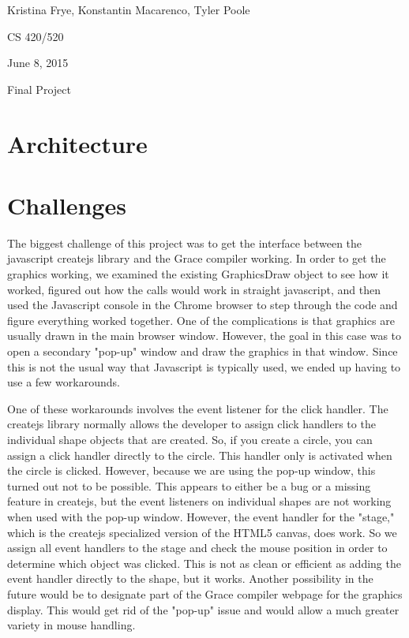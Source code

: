 \documentclass{article}
\begin{document}
{\raggedleft Kristina Frye, Konstantin Macarenco, Tyler Poole \par}
{\raggedleft CS 420/520 \par}
{\raggedleft June 8, 2015 \par}
{\raggedleft Final Project \par} 

\section {Architecture}

\section{Challenges}
The biggest challenge of this project was to get the interface between the javascript createjs library and the Grace
compiler working. In order to get the graphics working, we examined the existing GraphicsDraw object to see
how it worked, figured out how the calls would work in straight javascript, and then used the Javascript console
in the Chrome browser to step through the code and figure everything worked together. One of the complications
is that graphics are usually drawn in the main browser window. However, the goal in this case was to open a
secondary "pop-up" window and draw the graphics in that window. Since this is not the usual way that Javascript
is typically used, we ended up having to use a few workarounds.

One of these workarounds involves the event listener for the click handler. The createjs library normally allows the
developer to assign click handlers to the individual shape objects that are created. So, if you create a circle, you can
assign a click handler directly to the circle. This handler only is activated when the circle is clicked. However, because
we are using the pop-up window, this turned out not to be possible. This appears to either be a bug or a missing
feature in createjs, but the event listeners on individual shapes are not working when used with the pop-up window.
However, the event handler for the "stage," which is the createjs specialized version of the HTML5 canvas, does
work. So we assign all event handlers to the stage and check the mouse position in order to determine which
object was clicked. This is not as clean or efficient as adding the event handler directly to the shape, but it works.
Another possibility in the future would be to designate part of the Grace compiler webpage for the graphics display.
This would get rid of the "pop-up" issue and would allow a much greater variety in mouse handling.
\end{document}
